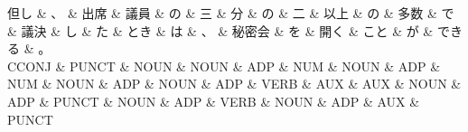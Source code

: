 \documentclass[tikz,border=5pt]{standalone}
\begin{document}
\normalsize
\begin{dependency}[edge unit distance=11.9pt]
    \begin{deptext}[column sep=1em]
        但し \& 、 \& 出席 \& 議員 \& の \& 三 \& 分 \& の \& 二 \& 以上 \& の \& 多数 \& で \& 議決 \& し \& た \& とき \& は \& 、 \& 秘密会 \& を \& 開く \& こと \& が \& できる \& 。\\
        CCONJ \& PUNCT \& NOUN \& NOUN \& ADP \& NUM \& NOUN \& ADP \& NUM \& NOUN \& ADP \& NOUN \& ADP \& VERB \& AUX \& AUX \& NOUN \& ADP \& PUNCT \& NOUN \& ADP \& VERB \& NOUN \& ADP \& AUX \& PUNCT\\
    \end{deptext}
\end{dependency}
\end{document}

